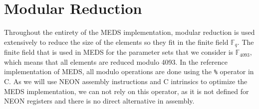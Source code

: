 \documentclass[11pt,a4paper]{report}
\theoremstyle{definition}
\begin{document}
\section{Modular Reduction}
\label{sec:modularreduction}
Throughout the entirety of the MEDS implementation, modular reduction is used extensively to reduce the size of the elements so they fit in the finite field $\mathbb{F}_q$. The finite field that is used in MEDS for the parameter sets that we consider is $\mathbb{F}_{4093}$, which means that all elements are reduced modulo 4093. In the reference implementation of MEDS, all modulo operations are done using the \texttt{\%} operator in C. As we will use NEON assembly instructions and C intrinsics to optimize the MEDS implementation, we can not rely on this operator, as it is not defined for NEON registers and there is no direct alternative in assembly.
\end{document}
